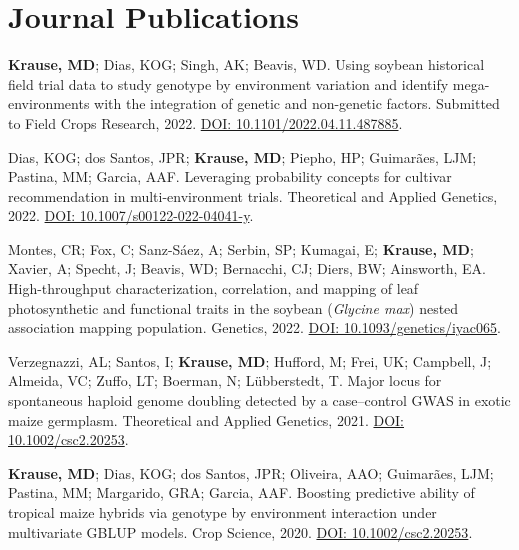 \documentclass[]{mdkrause_cv_openfont}
\begin{document}
\begin{minipage}[t]{1\textwidth} 


\section{Journal Publications} 

\sectionsep
\textbf{Krause, MD}; Dias, KOG; Singh, AK; Beavis, WD. Using soybean historical field trial data to study genotype by environment variation and identify mega-environments with the integration of genetic and non-genetic factors. Submitted to Field Crops Research, 2022. \href{https://www.biorxiv.org/content/10.1101/2022.04.11.487885v3.abstract}{DOI: 10.1101/2022.04.11.487885}. \ExternalLink

\sectionsep
Dias, KOG; dos Santos, JPR; \textbf{Krause, MD}; Piepho, HP; Guimarães, LJM; Pastina, MM; Garcia, AAF. Leveraging probability concepts for cultivar recommendation in multi-environment trials. Theoretical and Applied Genetics, 2022. \href{https://link.springer.com/article/10.1007/s00122-022-04041-y}{DOI: 10.1007/s00122-022-04041-y}. \ExternalLink 

\sectionsep
Montes, CR; Fox, C; Sanz-Sáez, A; Serbin, SP; Kumagai, E; \textbf{Krause, MD}; Xavier, A; Specht, J; Beavis, WD; Bernacchi, CJ; Diers, BW; Ainsworth, EA. High-throughput characterization, correlation, and mapping of leaf photosynthetic and functional traits in the soybean (\textit{Glycine max}) nested association mapping population. Genetics, 2022. \href{https://academic.oup.com/genetics/advance-article/doi/10.1093/genetics/iyac065/6572345?login=true}{DOI: 10.1093/genetics/iyac065}. \ExternalLink

\sectionsep
Verzegnazzi, AL; Santos, I; \textbf{Krause, MD}; Hufford, M; Frei, UK; Campbell, J; Almeida, VC; Zuffo, LT; Boerman, N; Lübberstedt, T. Major locus for spontaneous haploid genome doubling detected by a case–control GWAS in exotic maize germplasm. Theoretical and Applied Genetics, 2021. \href{https://link.springer.com/article/10.1007/s00122-021-03780-8}{DOI: 10.1002/csc2.20253}. \ExternalLink 

\sectionsep
\textbf{Krause, MD}; Dias, KOG; dos Santos, JPR; Oliveira, AAO; Guimarães, LJM; Pastina, MM; Margarido, GRA; Garcia, AAF. Boosting predictive ability of tropical maize hybrids via genotype by environment interaction under multivariate GBLUP models. Crop Science, 2020. \href{https://acsess.onlinelibrary.wiley.com/doi/full/10.1002/csc2.20253}{DOI: 10.1002/csc2.20253}. \ExternalLink 


\end{minipage}
\end{document}

